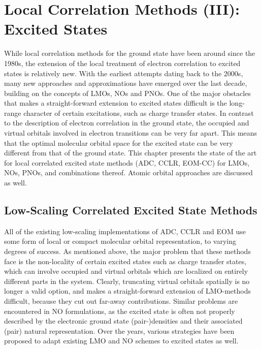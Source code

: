 \chapter{Local Correlation Methods (III): Excited States}

While local correlation methods for the ground state have been around since the 1980s, the extension of the local treatment of electron correlation to excited states is relatively new. With the earliest attempts dating back to the 2000s, many new approaches and approximations have emerged over the last decade, building on the concepts of LMOs, NOs and PNOs. One of the major obstacles that makes a straight-forward extension to excited states difficult is the long-range character of certain excitations, such as charge transfer states. In contrast to the description of electron correlation in the ground state, the occupied and virtual orbitals involved in electron transitions can be very far apart. This means that the optimal molecular orbital space for the excited state can be very different from that of the ground state. This chapter presents the state of the art for local correlated excited state methods (ADC, CCLR, EOM-CC) for LMOs, NOs, PNOs, and combinations thereof. Atomic orbital approaches are discussed as well. 



\section{Low-Scaling Correlated Excited State Methods}

All of the existing low-scaling implementations of ADC, CCLR and EOM use some form of local or compact molecular orbital representation, to varying degrees of success. As mentioned above, the major problem that these methods face is the non-locality of certain excited states such as charge transfer states, which can involve occupied and virtual orbitals which are localized on entirely different parts in the system. Clearly, truncating virtual orbitals spatially is no longer a valid option, and makes a straight-forward extension of LMO-methods difficult, because they cut out far-away contributions. Similar problems are encountered in NO formulations, as the excited state is often not properly described by the electronic ground state (pair-)densities and their associated (pair) natural representation. Over the years, various strategies have been proposed to adapt existing LMO and NO schemes to excited states as well. 

